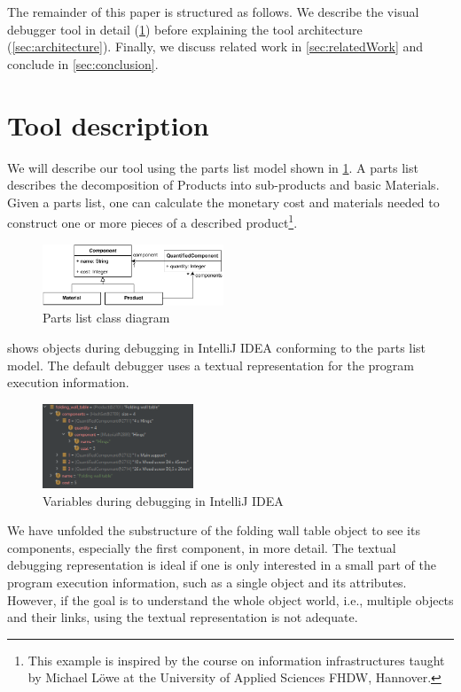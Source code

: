 \documentclass[conference]{IEEEtran}
\newcommand{\intellij}{IntelliJ IDEA}
\begin{document}
The remainder of this paper is structured as follows.
We describe the visual debugger tool in detail (\cref{sec:toolDescription}) before explaining the tool architecture (\cref{sec:architecture}).
Finally, we discuss related work in \cref{sec:relatedWork} and conclude in \cref{sec:conclusion}.

\section{Tool description} \label{sec:toolDescription}
We will describe our tool using the parts list model shown in \cref{fig:partsListModel}.
A parts list describes the decomposition of \textsf{Products} into sub-products and basic \textsf{Materials}.
Given a parts list, one can calculate the monetary cost and materials needed to construct one or more pieces of a described product\footnote{This example is inspired by the course on information infrastructures taught by Michael Löwe at the University of Applied Sciences FHDW, Hannover.}.

\begin{figure}[h]
    \centering
    \includegraphics[width=0.48\textwidth]{images/VD-partsList-classes.pdf}
    \caption{Parts list class diagram}
    \label{fig:partsListModel}
\end{figure}

 shows objects during debugging in \intellij{} conforming to the parts list model. 
The default debugger uses a textual representation for the program execution information.

\begin{figure}[h]
    \centering
    \includegraphics[width=0.4\textwidth]{images/variables.png}
    \caption{Variables during debugging in \intellij}
    \label{fig:variablesIntellij}
\end{figure}

We have unfolded the substructure of the \textsf{folding wall table} object to see its components, especially the first component, in more detail.
The textual debugging representation is ideal if one is only interested in a small part of the program execution information, such as a single object and its attributes.
However, if the goal is to understand the whole object world, i.e., multiple objects and their links, using the textual representation is not adequate.
\end{document}
